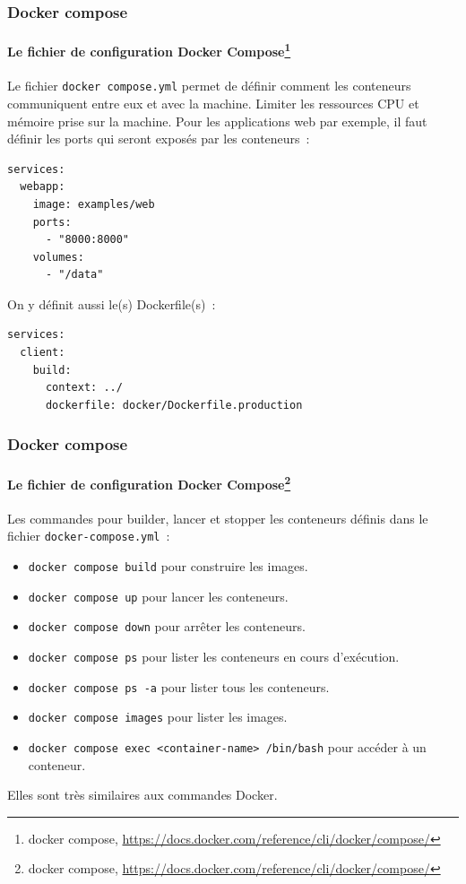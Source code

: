 \documentclass{beamer}
\begin{document}
    \begin{frame}[fragile]
        \transdissolve
        \frametitle{Docker compose}
        \framesubtitle{Le fichier de configuration Docker Compose\footnote{docker compose, \url{https://docs.docker.com/reference/cli/docker/compose/}}}
        Le fichier \lstinline{docker compose.yml} permet de définir comment les conteneurs communiquent entre eux et avec la machine.
        Limiter les ressources CPU et mémoire prise sur la machine.
        \bigbreak
        Pour les applications web par exemple, il faut définir les ports qui seront exposés par les conteneurs~:
        \begin{lstlisting}
services:
  webapp:
    image: examples/web
    ports:
      - "8000:8000"
    volumes:
      - "/data"
        \end{lstlisting}
        On y définit aussi le(s) Dockerfile(s)~:
        \begin{lstlisting}
services:
  client:
    build:
      context: ../
      dockerfile: docker/Dockerfile.production
        \end{lstlisting}
    \end{frame}

    \begin{frame}[fragile]
        \transdissolve
        \frametitle{Docker compose}
        \framesubtitle{Le fichier de configuration Docker Compose\footnote{docker compose, \url{https://docs.docker.com/reference/cli/docker/compose/}}}
        Les commandes pour builder, lancer et stopper les conteneurs définis dans le fichier \lstinline{docker-compose.yml}~:
        \begin{itemize}
            \item \lstinline{docker compose build} pour construire les images.
            \item \lstinline{docker compose up} pour lancer les conteneurs.
            \item \lstinline{docker compose down} pour arrêter les conteneurs.
            \item \lstinline{docker compose ps} pour lister les conteneurs en cours d'exécution.
            \item \lstinline{docker compose ps -a} pour lister tous les conteneurs.
            \item \lstinline{docker compose images} pour lister les images.
            \item \lstinline{docker compose exec <container-name> /bin/bash} pour accéder à un conteneur.
        \end{itemize}
        Elles sont très similaires aux commandes Docker.
    \end{frame}
\end{document}
